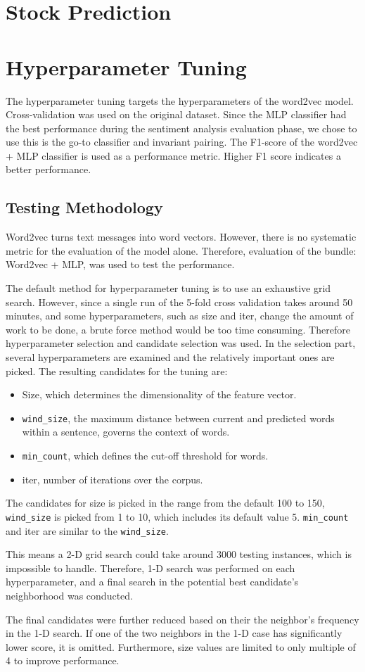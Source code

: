 \documentclass[11pt,a4paper]{article}
\begin{document}
\section{Stock Prediction} 

\section{Hyperparameter Tuning}
The hyperparameter tuning targets the hyperparameters of the word2vec model. Cross-validation was used on the original dataset. Since the MLP classifier had the best performance during the sentiment analysis evaluation phase, we chose to use this is the go-to classifier and invariant pairing. The F1-score of the word2vec + MLP classifier is used as a performance metric. Higher F1 score indicates a better performance. 
\subsection{Testing Methodology}
Word2vec turns text messages into word vectors. However, there is no systematic metric for the evaluation of the model alone. Therefore, evaluation of the bundle: Word2vec + MLP, was used to test the performance. \par
The default method for hyperparameter tuning is to use an exhaustive grid search. However, since a single run of the 5-fold cross validation takes around 50 minutes, and some hyperparameters, such as size and iter, change the amount of work to be done, a brute force method would be too time consuming. Therefore hyperparameter selection and candidate selection was used. In the selection part, several hyperparameters are examined and the relatively important ones are picked. The resulting candidates for the tuning are:
\begin{itemize}
	\item Size, which determines the dimensionality of the feature vector.
	\item \texttt{wind\_size}, the maximum distance between current and predicted words within a sentence, governs the context of words.
	\item \texttt{min\_count}, which defines the cut-off threshold for words.
	\item iter, number of iterations over the corpus.
\end{itemize}
The candidates for size is picked in the range from the default 100 to 150, \texttt{wind\_size} is picked from 1 to 10, which includes its default value 5. \texttt{min\_count} and iter are similar to the \texttt{wind\_size}. 
\par
This means a 2-D grid search could take around 3000 testing instances, which is impossible to handle. Therefore, 1-D search was performed on each hyperparameter, and a final search in the potential best candidate's neighborhood was conducted.
\par
The final candidates were further reduced based on their the neighbor's frequency in the 1-D search. If one of the two neighbors in the 1-D case has significantly lower score, it is omitted. Furthermore, size values are limited to only multiple of 4 to improve performance.
\end{document}
